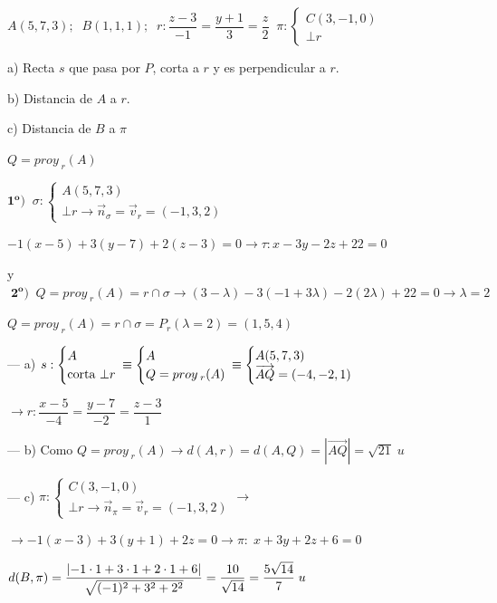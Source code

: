 \begin{ejre}
	$A(5,7,3);\;\; B(1,1,1);\;\;r:\dfrac{z-3}{-1}=\dfrac{y+1}{3}=\dfrac{z}{2}\;\; \pi:\begin{cases} C(3,-1,0) \\ \bot r \end{cases}$

a) Recta $s$ que pasa por $P$, corta a $r$ y es perpendicular a $r$.

b) Distancia de $A$ a $r$.	

c) Distancia de $B$ a $\pi$
\end{ejre}
\begin{proofw}\renewcommand{\qedsymbol}{$\diamond$}	

\noindent $Q=proy_{\;r}(A)$

\noindent $\boldsymbol{1^o)}\;\; \sigma:\begin{cases} A(5,7,3)\\\bot r\to \vec n_{\sigma}=\vec v_r=(-1,3,2)\end{cases}$

\noindent $-1(x-5)+3(y-7)+2(z-3)=0\to \tau: x-3y-2z+22=0$

\noindent y $\; \boldsymbol{2^o)}\;\; Q=proy_{\;r}(A)=r\cap \sigma \to (3-\lambda)-3(-1+3\lambda)-2(2\lambda)+22=0 \to \lambda=2$

\noindent $Q=proy_{\;r}(A)=r\cap \sigma =P_r(\lambda=2)=(1,5,4)$

\noindent --- a) $s:\begin{cases} A \\ \text{corta } \bot r \end{cases} \hspace{-3mm}\equiv \begin{cases} A \\ Q=proy_{\;r}(A) \end{cases}\hspace{-3mm}\equiv \begin{cases} A(5,7,3)\\ \overrightarrow{AQ}=(-4,-2,1)\end{cases}$ 

\noindent $\to r:\dfrac{x-5}{-4}=\dfrac{y-7}{-2}=\dfrac{z-3}{1}$

\noindent --- b) Como $Q=proy_{\;r}(A) \to d(A,r)=d(A,Q)=|\overrightarrow{AQ}|=\sqrt{21}\; u$

\noindent --- c) $\pi:\begin{cases} C(3,-1,0) \\ \bot r \to \vec n_{\pi}=\vec v_r=(-1,3,2) \end{cases} \to $

\noindent $\to -1(x-3)+3(y+1)+2z=0 \to \pi:\; x+3y+2z+6=0$

\noindent $d(B,\pi)=\dfrac {\abs{-1\cdot 1+3\cdot 1+2\cdot 1 + 6}}{\sqrt{(-1)^2+3^2+2^2}}=\dfrac {10}{\sqrt{14}}=\dfrac {5\sqrt{14}}{7}\; u$

\end{proofw}

